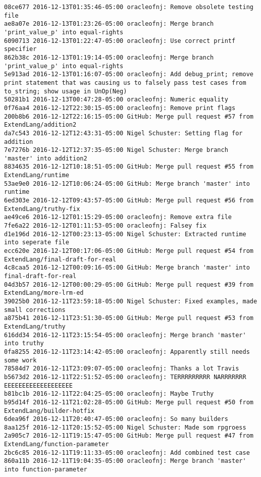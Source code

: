 \begin{lstlisting}
08ce677 2016-12-13T01:35:46-05:00 oracleofnj: Remove obsolete testing file
ae8a07e 2016-12-13T01:23:26-05:00 oracleofnj: Merge branch 'print_value_p' into equal-rights
6090713 2016-12-13T01:22:47-05:00 oracleofnj: Use correct printf specifier
862b38c 2016-12-13T01:19:14-05:00 oracleofnj: Merge branch 'print_value_p' into equal-rights
5e913ad 2016-12-13T01:16:07-05:00 oracleofnj: Add debug_print; remove print statement that was causing us to falsely pass test cases from to_string; show usage in UnOp(Neg)
50281b1 2016-12-13T00:47:28-05:00 oracleofnj: Numeric equality
0f76aa4 2016-12-12T22:30:15-05:00 oracleofnj: Remove print flags
200b8b6 2016-12-12T22:16:15-05:00 GitHub: Merge pull request #57 from ExtendLang/addition2
da7c543 2016-12-12T12:43:31-05:00 Nigel Schuster: Setting flag for addition
7e7276b 2016-12-12T12:37:35-05:00 Nigel Schuster: Merge branch 'master' into addition2
8834635 2016-12-12T10:18:51-05:00 GitHub: Merge pull request #55 from ExtendLang/runtime
53ae9e0 2016-12-12T10:06:24-05:00 GitHub: Merge branch 'master' into runtime
6ed303e 2016-12-12T09:43:57-05:00 GitHub: Merge pull request #56 from ExtendLang/truthy-fix
ae49ce6 2016-12-12T01:15:29-05:00 oracleofnj: Remove extra file
7fe6a22 2016-12-12T01:11:53-05:00 oracleofnj: Falsey fix
d1e196d 2016-12-12T00:23:13-05:00 Nigel Schuster: Extracted runtime into seperate file
ecc620e 2016-12-12T00:17:06-05:00 GitHub: Merge pull request #54 from ExtendLang/final-draft-for-real
4c8caa5 2016-12-12T00:09:16-05:00 GitHub: Merge branch 'master' into final-draft-for-real
04d3b57 2016-12-12T00:00:29-05:00 GitHub: Merge pull request #39 from ExtendLang/more-lrm-ed
39025b0 2016-12-11T23:59:18-05:00 Nigel Schuster: Fixed examples, made small corrections
a875b41 2016-12-11T23:51:30-05:00 GitHub: Merge pull request #53 from ExtendLang/truthy
616dd34 2016-12-11T23:15:54-05:00 oracleofnj: Merge branch 'master' into truthy
0fa8255 2016-12-11T23:14:42-05:00 oracleofnj: Apparently still needs some work
78584d7 2016-12-11T23:09:07-05:00 oracleofnj: Thanks a lot Travis
b5673d2 2016-12-11T22:51:52-05:00 oracleofnj: TERRRRRRRRR NARRRRRRR EEEEEEEEEEEEEEEEEEE
b81bc1b 2016-12-11T22:04:25-05:00 oracleofnj: Maybe Truthy
b95d14f 2016-12-11T21:02:28-05:00 GitHub: Merge pull request #50 from ExtendLang/builder-hotfix
6dea96f 2016-12-11T20:40:47-05:00 oracleofnj: So many builders
8aa125f 2016-12-11T20:15:52-05:00 Nigel Schuster: Made som rpgroess
2a905c7 2016-12-11T19:15:47-05:00 GitHub: Merge pull request #47 from ExtendLang/function-parameter
2bc6c85 2016-12-11T19:11:33-05:00 oracleofnj: Add combined test case
860a11b 2016-12-11T19:04:35-05:00 oracleofnj: Merge branch 'master' into function-parameter

\end{lstlisting}
